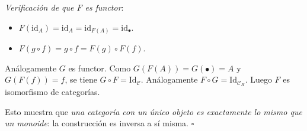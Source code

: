\begin{enumerate}[label=\textbf{4.\arabic*.}]
\textit{Verificación de que \(F\) es functor}:
\begin{itemize}
    \item \(F(\mathrm{id}_A)=\mathrm{id}_A=\mathrm{id}_{F(A)}=\mathrm{id}_\bullet\).
    \item \(F(g\circ f)=g\circ f=F(g)\circ F(f)\).
\end{itemize}
Análogamente \(G\) es functor. Como \(G(F(A))=G(\bullet)=A\) y \(G(F(f))=f\),
se tiene \(G\circ F=\mathrm{Id}_{\mathcal{C}}\). Análogamente
\(F\circ G=\mathrm{Id}_{\mathcal{C}_H}\). Luego \(F\) es isomorfismo de categorías.

Esto muestra que \textit{una categoría con un único objeto es exactamente lo mismo
que un monoide}: la construcción es inversa a sí misma. \hfill\(\square\)

\end{enumerate}
